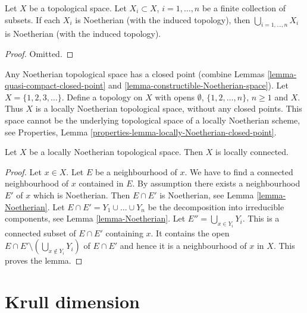\begin{lemma}
\label{lemma-finite-union-Noetherian}
Let $X$ be a topological space.
Let $X_i \subset X$, $i = 1, \ldots, n$ be a finite collection of subsets.
If each $X_i$ is Noetherian (with the induced topology), then
$\bigcup_{i = 1, \ldots, n}  X_i$ is Noetherian (with the induced topology).
\end{lemma}

\begin{proof}
Omitted.
\end{proof}

\begin{example}
\label{example-locally-Noetherian-no-closed-point}
Any Noetherian topological space has a closed point (combine
Lemmas \ref{lemma-quasi-compact-closed-point} and
\ref{lemma-constructible-Noetherian-space}).
Let $X = \{1, 2, 3, \ldots \}$. Define a topology on $X$
with opens $\emptyset$, $\{1, 2, \ldots, n\}$, $n \geq 1$
and $X$. Thus $X$ is a locally Noetherian topological space,
without any closed points. This space cannot be the underlying
topological space of a locally Noetherian scheme, see
Properties, Lemma \ref{properties-lemma-locally-Noetherian-closed-point}.
\end{example}

\begin{lemma}
\label{lemma-locally-Noetherian-locally-connected}
Let $X$ be a locally Noetherian topological space.
Then $X$ is locally connected.
\end{lemma}

\begin{proof}
Let $x \in X$. Let $E$ be a neighbourhood of $x$.
We have to find a connected neighbourhood of $x$ contained
in $E$. By assumption there exists a neighbourhood $E'$ of $x$
which is Noetherian. Then $E \cap E'$ is Noetherian, see
Lemma \ref{lemma-Noetherian}.
Let $E \cap E' = Y_1 \cup \ldots \cup Y_n$ be the decomposition
into irreducible components, see
Lemma \ref{lemma-Noetherian}.
Let $E'' = \bigcup_{x \in Y_i} Y_i$. This is a connected
subset of $E \cap E'$ containing $x$. It contains the open
$E \cap E' \setminus (\bigcup_{x \not \in Y_i} Y_i)$ of $E \cap E'$
and hence it is a neighbourhood of $x$ in $X$. This proves the lemma.
\end{proof}



\section{Krull dimension}
\label{section-krull-dimension}

